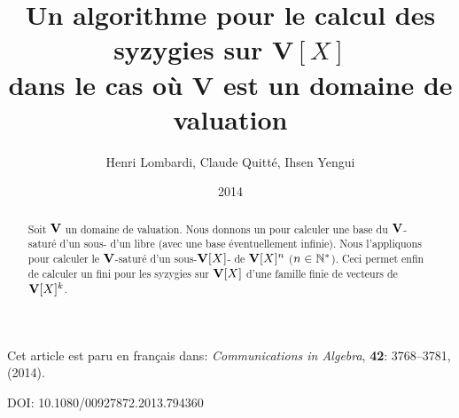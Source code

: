 
\clearpage

\setcounter{section}{0}

\def\frenchproofname{\textsl{Démonstration}}
\FrenchFootnotes




\startcontents[french]



\title{Un algorithme pour le calcul des syzygies sur  $\mathbf{V}[X]$\\
dans le cas où $\mathbf{V}$ est un domaine de valuation}
\author{
Henri Lombardi, 
Claude Quitté, Ihsen Yengui}

\date{2014}




\def\thefootnote{\arabic{footnote}}

 

















\stMF

\maketitle

Cet article est paru en français dans: \textsl{Communications in Algebra}, {\bf 42}: 3768–3781, (2014). 

DOI: 10.1080/00927872.2013.794360



\begin{abstract} Soit $\mathbf{V}$ un domaine de valuation.
Nous donnons un \algo  pour calculer une base du $\mathbf{V}$-saturé d'un sous-\mtf
d'un \Vmo libre (avec une base éventuellement infinie). Nous l'appliquons pour calculer le $\mathbf{V}$-saturé d'un sous-$\mathbf{V}[X]$-\mtf
de $\mathbf{V}[X]^n$ ($n\in\mathbb{N}^*$). Ceci permet enfin de calculer
un \sgr fini pour les syzygies sur  $\mathbf{V}[X]$ d'une famille finie de vecteurs de $\mathbf{V}[X]^k$.
\end{abstract}


